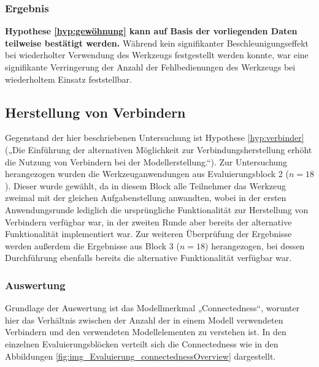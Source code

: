 \subsubsection{Ergebnis} 

\textbf{Hypothese \ref{hyp:gewöhnung} kann auf Basis der vorliegenden Daten teilweise bestätigt werden.} Während kein signifikanter Beschleunigungseffekt bei wiederholter Verwendung des Werkzeugs festgestellt werden konnte, war eine signifikante Verringerung der Anzahl der Fehlbedienungen des Werkzeugs bei wiederholtem Einsatz feststellbar.


\subsection{Herstellung von Verbindern} %
\label{sub:herstellung_von_verbindern}

Gegenstand der hier beschriebenen Untersuchung ist Hypothese \ref{hyp:verbinder} („Die Einführung der alternativen Möglichkeit zur Verbindungsherstellung erhöht die Nutzung von Verbindern bei der Modellerstellung.“). Zur Untersuchung herangezogen wurden die Werkzeuganwendungen aus Evaluierungsblock 2 ($n=18$). Dieser wurde gewählt, da in diesem Block alle Teilnehmer das Werkzeug zweimal mit der gleichen Aufgabenstellung anwandten, wobei in der ersten Anwendungsrunde lediglich die ursprüngliche Funktionalität zur Herstellung von Verbindern verfügbar war, in der zweiten Runde aber bereits der alternative Funktionalität implementiert war. Zur weiteren Überprüfung der Ergebnisse werden außerdem die Ergebnisse aus Block 3 ($n=18$) herangezogen, bei dessen Durchführung ebenfalls bereits die alternative Funktionalität verfügbar war.

\subsubsection{Auswertung} %

Grundlage der Auswertung ist das Modellmerkmal „Connectedness“, worunter hier das Verhältnis zwischen der Anzahl der in einem Modell verwendeten Verbindern und den verwendeten Modellelementen zu verstehen ist. In den einzelnen Evaluierungsblöcken verteilt sich die Connectedness wie in den Abbildungen \ref{fig:img_Evaluierung_connectednessOverview} dargestellt.

